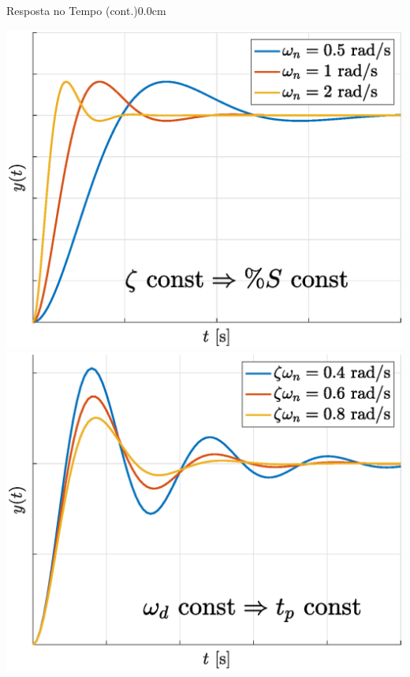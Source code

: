 \documentclass[portuguese,10pt,3col]{cheatsheet}
\begin{document}
\begin{multicols}{3}
\begin{cheatsheetbox}{Resposta no Tempo (cont.)}{0.0cm}
\begin{minipage}{.35\textwidth}
    \end{minipage}%
    \begin{minipage}{.16\textwidth}
        \centering
        \scalebox{0.5}{}
        \scalebox{0.5}{}
    \end{minipage}%
    \begin{minipage}{.34\textwidth}
        \centering
        \includegraphics[scale = 0.15]{figs/fig8.eps}
        \includegraphics[scale = 0.15]{figs/fig9.eps}
    \end{minipage}
    

\end{cheatsheetbox}
\end{multicols}
\end{document}
